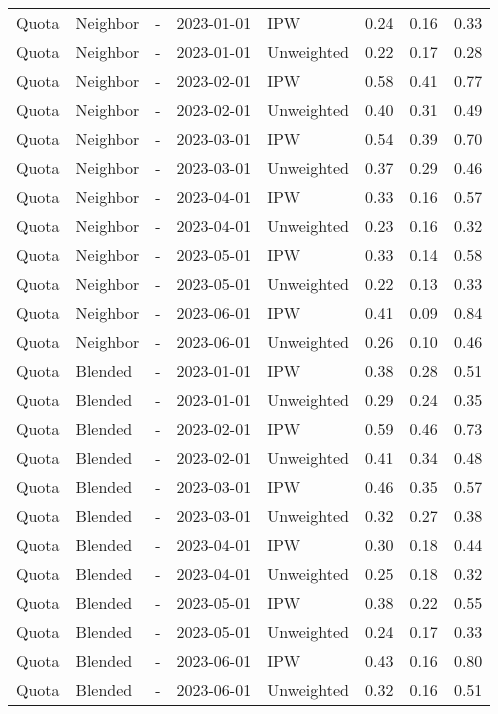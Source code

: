 \begin{longtable}[t]{lllllrrr}
Quota & Neighbor & - & 2023-01-01 & IPW & 0.24 & 0.16 & 0.33\\
Quota & Neighbor & - & 2023-01-01 & Unweighted & 0.22 & 0.17 & 0.28\\
\addlinespace
Quota & Neighbor & - & 2023-02-01 & IPW & 0.58 & 0.41 & 0.77\\
Quota & Neighbor & - & 2023-02-01 & Unweighted & 0.40 & 0.31 & 0.49\\
Quota & Neighbor & - & 2023-03-01 & IPW & 0.54 & 0.39 & 0.70\\
Quota & Neighbor & - & 2023-03-01 & Unweighted & 0.37 & 0.29 & 0.46\\
Quota & Neighbor & - & 2023-04-01 & IPW & 0.33 & 0.16 & 0.57\\
\addlinespace
Quota & Neighbor & - & 2023-04-01 & Unweighted & 0.23 & 0.16 & 0.32\\
Quota & Neighbor & - & 2023-05-01 & IPW & 0.33 & 0.14 & 0.58\\
Quota & Neighbor & - & 2023-05-01 & Unweighted & 0.22 & 0.13 & 0.33\\
Quota & Neighbor & - & 2023-06-01 & IPW & 0.41 & 0.09 & 0.84\\
Quota & Neighbor & - & 2023-06-01 & Unweighted & 0.26 & 0.10 & 0.46\\
\addlinespace
Quota & Blended & - & 2023-01-01 & IPW & 0.38 & 0.28 & 0.51\\
Quota & Blended & - & 2023-01-01 & Unweighted & 0.29 & 0.24 & 0.35\\
Quota & Blended & - & 2023-02-01 & IPW & 0.59 & 0.46 & 0.73\\
Quota & Blended & - & 2023-02-01 & Unweighted & 0.41 & 0.34 & 0.48\\
Quota & Blended & - & 2023-03-01 & IPW & 0.46 & 0.35 & 0.57\\
\addlinespace
Quota & Blended & - & 2023-03-01 & Unweighted & 0.32 & 0.27 & 0.38\\
Quota & Blended & - & 2023-04-01 & IPW & 0.30 & 0.18 & 0.44\\
Quota & Blended & - & 2023-04-01 & Unweighted & 0.25 & 0.18 & 0.32\\
Quota & Blended & - & 2023-05-01 & IPW & 0.38 & 0.22 & 0.55\\
Quota & Blended & - & 2023-05-01 & Unweighted & 0.24 & 0.17 & 0.33\\
\addlinespace
Quota & Blended & - & 2023-06-01 & IPW & 0.43 & 0.16 & 0.80\\
Quota & Blended & - & 2023-06-01 & Unweighted & 0.32 & 0.16 & 0.51\\*
\end{longtable}
